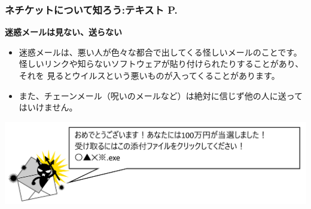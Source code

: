 \documentclass[dvipdfmx]{beamer}
\begin{document}
\begin{frame}[fragile]
	\frametitle{ネチケットについて知ろう:テキスト P.\pageref{1:P:Netiquette}~~~}
    \large\textbf{迷惑メールは見ない、送らない}
            \begin{itemize}
                \item 迷惑メールは、悪い人が色々な都合で出してくる怪しいメールのことです。
                怪しいリンクや知らないソフトウェアが貼り付けられたりすることがあり、それを
                見るとウイルスという悪いものが入ってくることがあります。
                \item また、チェーンメール（呪いのメールなど）は絶対に信じず他の人に送ってはいけません。         
            \end{itemize}
            \vfill
            
			\begin{minipage}{\textwidth}
                {\upshape
                  \includegraphics[width=\textwidth]{slide07-img006.png}}
            \end{minipage}
\end{frame}
\end{document}
